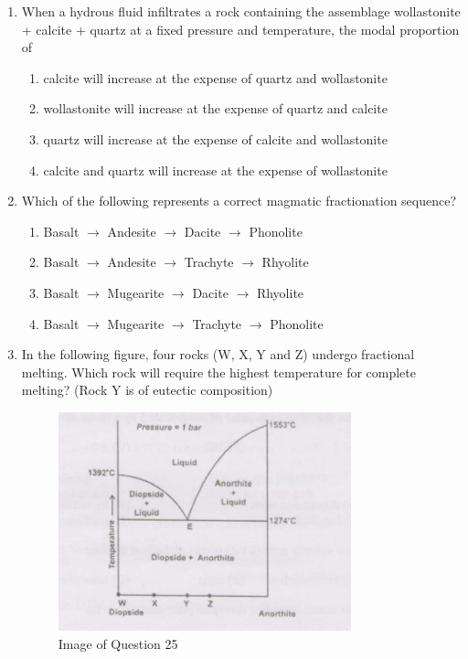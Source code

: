 \documentclass[journal,12pt,onecolumn]{IEEEtran}
\theoremstyle{remark}
\begin{document}
\begin{enumerate}[resume]
\item When a hydrous fluid infiltrates a rock containing the assemblage wollastonite + calcite + quartz at a fixed pressure and temperature, the modal proportion of
\begin{enumerate}
\item calcite will increase at the expense of quartz and wollastonite
\item wollastonite will increase at the expense of quartz and calcite
\item quartz will increase at the expense of calcite and wollastonite
\item calcite and quartz will increase at the expense of wollastonite
\vspace{0.5cm}
\end{enumerate}


\item Which of the following represents a correct magmatic fractionation sequence?
\begin{enumerate}
\item Basalt $\rightarrow$ Andesite $\rightarrow$ Dacite $\rightarrow$ Phonolite
\item Basalt $\rightarrow$ Andesite $\rightarrow$ Trachyte $\rightarrow$ Rhyolite
\item Basalt $\rightarrow$ Mugearite $\rightarrow$ Dacite $\rightarrow$ Rhyolite
\item Basalt $\rightarrow$ Mugearite $\rightarrow$ Trachyte $\rightarrow$ Phonolite
\vspace{0.5cm}
\end{enumerate}



\item In the following figure, four rocks (W, X, Y and Z) undergo fractional melting. Which rock will require the highest temperature for complete melting? (Rock Y is of eutectic composition)

\begin{figure}[h]
    \centering
    \includegraphics[width=0.8\textwidth]{figs/fig1.png}
    \caption{Image of Question 25}
    \label{fig:question25}
\end{figure}


\end{enumerate}
\end{document}

